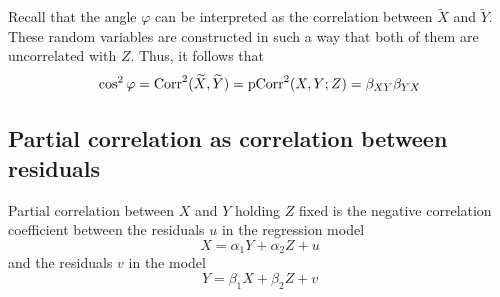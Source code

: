Recall that the angle $\varphi$ can be interpreted as the correlation
between $\widetilde X$ and $\widetilde Y$.
These random variables are constructed in such a way that both of them
are uncorrelated with $Z$. Thus, it follows that
\[
\cos^2 \varphi = \operatorname{Corr}^2(\widetilde X, \widetilde Y) = \operatorname{pCorr}^2(X,Y; Z) = \beta_{XY} \beta_{YX}
\]

\subsection{Partial correlation as correlation between residuals}




\begin{theorem}
Partial correlation between $X$ and $Y$ holding $Z$ fixed is the negative
correlation coefficient between the residuals $u$ in the regression model
\[
X = \alpha_1 Y + \alpha_2 Z + u
\]
and the residuals $v$ in the model
\[
Y = \beta_1 X + \beta_2 Z + v
\]
\end{theorem}

